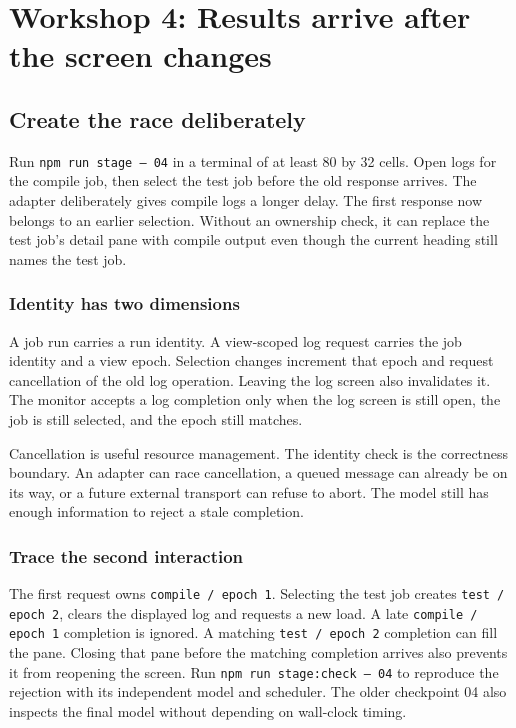 \chapter{Workshop 4: Results arrive after the screen changes}\label{workshop-04}

\section{Create the race deliberately}

Run \texttt{npm run stage -- 04} in a terminal of at least 80 by 32 cells. Open logs for the compile job, then select the test job before the old response arrives. The adapter deliberately gives compile logs a longer delay. The first response now belongs to an earlier selection. Without an ownership check, it can replace the test job's detail pane with compile output even though the current heading still names the test job.

\subsection{Identity has two dimensions}

A job run carries a run identity. A view-scoped log request carries the job identity and a view epoch. Selection changes increment that epoch and request cancellation of the old log operation. Leaving the log screen also invalidates it. The monitor accepts a log completion only when the log screen is still open, the job is still selected, and the epoch still matches.

Cancellation is useful resource management. The identity check is the correctness boundary. An adapter can race cancellation, a queued message can already be on its way, or a future external transport can refuse to abort. The model still has enough information to reject a stale completion.



\subsection{Trace the second interaction}

The first request owns \texttt{compile / epoch 1}. Selecting the test job creates \texttt{test / epoch 2}, clears the displayed log and requests a new load. A late \texttt{compile / epoch 1} completion is ignored. A matching \texttt{test / epoch 2} completion can fill the pane. Closing that pane before the matching completion arrives also prevents it from reopening the screen. Run \texttt{npm run stage:check -- 04} to reproduce the rejection with its independent model and scheduler. The older checkpoint 04 also inspects the final model without depending on wall-clock timing.

